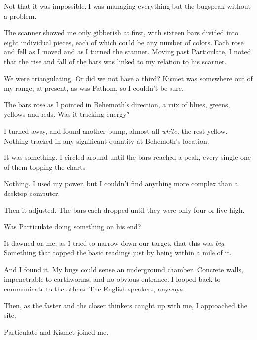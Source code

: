 Not that it was impossible.  I was managing everything but the bugspeak without a problem.



The scanner showed me only gibberish at first, with sixteen bars divided into eight individual pieces, each of which could be any number of colors.  Each rose and fell as I moved and as I turned the scanner.  Moving past Particulate, I noted that the rise and fall of the bars was linked to my relation to his scanner.



We were triangulating.  Or did we not have a third?  Kismet was somewhere out of my range, at present, as was Fathom, so I couldn't be sure.



The bars rose as I pointed in Behemoth's direction, a mix of blues, greens, yellows and reds.  Was it tracking energy?



I turned away, and found another bump, almost all \emph{white, }the rest yellow.  Nothing tracked in any significant quantity at Behemoth's location.



It was something.  I circled around until the bars reached a peak, every single one of them topping the charts.



Nothing.  I used my power, but I couldn't find anything more complex than a desktop computer.



Then it adjusted.  The bars each dropped until they were only four or five high.



Was Particulate doing something on his end?



It dawned on me, as I tried to narrow down our target, that this was \emph{big}.  Something that topped the basic readings just by being within a mile of it.



And I found it.  My bugs could sense an underground chamber.  Concrete walls, impenetrable to earthworms, and no obvious entrance.  I looped back to communicate to the others.  The English-speakers, anyways.



Then, as the faster and the closer thinkers caught up with me, I approached the site.



Particulate and Kismet joined me.



